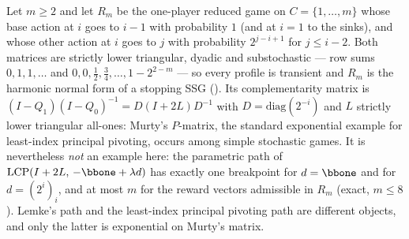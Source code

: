 \begin{proposition}\label{fsa:murty}
Let $m\ge2$ and let $R_m$ be the one-player reduced game on $C=\{1,\dots,m\}$
whose base action at $i$ goes to $i-1$ with probability $1$ (and at $i=1$ to
the sinks), and whose other action at $i$ goes to $j$ with probability
$2^{j-i+1}$ for $j\le i-2$. Both matrices are strictly lower triangular,
dyadic and substochastic --- row sums $0,1,1,\dots$ and
$0,0,\tfrac12,\tfrac34,\dots,1-2^{2-m}$ --- so every profile is transient and
$R_m$ is the harmonic normal form of a stopping SSG ().
Its complementarity matrix is
$(I-Q_1)(I-Q_0)^{-1}=D(I+2L)D^{-1}$ with $D=\mathrm{diag}(2^{-i})$ and $L$
strictly lower triangular all-ones: Murty's $P$-matrix, the standard
exponential example for least-index principal pivoting, occurs among simple
stochastic games. It is nevertheless \emph{not} an example here: the
parametric path of $\mathrm{LCP}(I+2L,\,-\bbone+\lambda d)$ has exactly one
breakpoint for $d=\bbone$ and for $d=(2^{i})_i$, and at most $m$ for the
reward vectors admissible in $R_m$ (exact, $m\le8$). Lemke's path and the
least-index principal pivoting path are different objects, and only the latter
is exponential on Murty's matrix.
\end{proposition}

